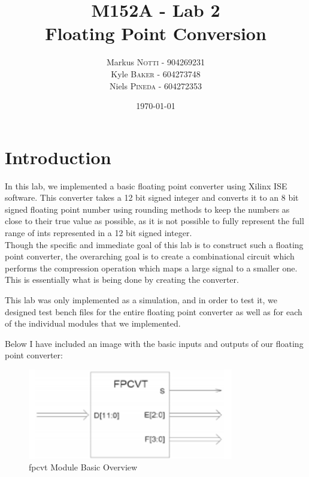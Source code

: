 \documentclass{article}
\title{M152A - Lab 2 \\ Floating Point Conversion} %
\author{Markus \textsc{Notti} - 904269231 \\ Kyle \textsc{Baker}  - 604273748 \\ Niels \textsc{Pineda} - 604272353} %
\date{\today} %
\begin{document}
\maketitle %


\section*{Introduction}

In this lab, we implemented a basic floating point converter using Xilinx ISE software.  This converter takes a 12 bit signed integer and converts it to an 8 bit signed floating point number using rounding methods to keep the numbers as close to their true value as possible, as it is not possible to fully represent the full range of ints represented in a 12 bit signed integer. \\

Though the specific and immediate goal of this lab is to construct such a floating point converter, the overarching goal is to create a combinational circuit which performs the compression operation which maps a large signal to a smaller one.  This is essentially what is being done by creating the converter.

This lab was only implemented as a simulation, and in order to test it, we designed test bench files for the entire floating point converter as well as for each of the individual modules that we implemented.

Below I have included an image with the basic inputs and outputs of our floating point converter:

\begin{figure}[H]
\begin{center}
\includegraphics[width=0.8\textwidth]{fpcvtModulePic.png} 
\caption{fpcvt Module Basic Overview}
\end{center}
\end{figure}
\end{document}
